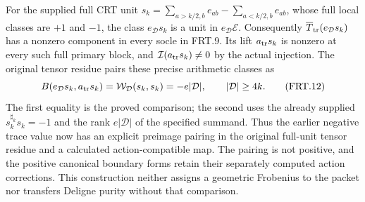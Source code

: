 For the supplied full CRT unit
$s_k=\sum_{a>k/2,b}e_{ab}-\sum_{a<k/2,b}e_{ab}$,
whose full local classes are $+1$ and $-1$, the class
$e_{\mathcal D}s_k$ is a unit in $e_{\mathcal D}\mathcal E$.
Consequently $\overline T_{\rm tr}(e_{\mathcal D}s_k)$ has a
nonzero component in every socle in FRT.9. Its lift
$a_{\rm tr}s_k$ is nonzero at every such full primary block,
and $\mathcal I(a_{\rm tr}s_k)\ne0$ by the actual injection.
The original tensor residue pairs these precise arithmetic classes as
\[
 B(e_{\mathcal D}s_k,a_{\rm tr}s_k)
   =\mathcal W_{\mathcal D}(s_k,s_k)
   =-e|\mathcal D|,\qquad |\mathcal D|\ge4k.
 \tag{FRT.12}
\]
The first equality is the proved comparison; the second uses the
already supplied $s_k^{\sharp_k}s_k=-1$ and the rank
$e|\mathcal D|$ of the specified summand. Thus the earlier negative
trace value now has an explicit preimage pairing in the original
full-unit tensor residue and a calculated action-compatible map.
The pairing is not positive, and the positive canonical boundary
forms retain their separately computed action corrections.
This construction neither assigns a geometric Frobenius to the
packet nor transfers Deligne purity without that comparison.
